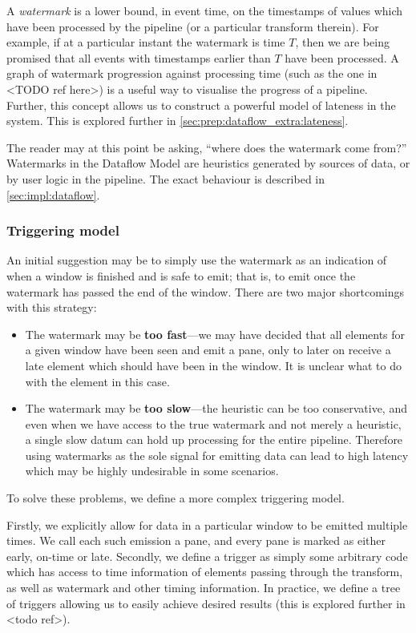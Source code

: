 A \emph{watermark} is a lower bound, in event time, on the timestamps of values which have been processed by the pipeline (or a particular transform therein).
For example, if at a particular instant the watermark is time $T$, then we are being promised that all events with timestamps earlier than $T$ have been processed.
A graph of watermark progression against processing time (such as the one in <TODO ref here>) is a useful way to visualise the progress of a pipeline.
Further, this concept allows us to construct a powerful model of lateness in the system.
This is explored further in \cref{sec:prep:dataflow_extra:lateness}.


The reader may at this point be asking, ``where does the watermark come from?''
Watermarks in the Dataflow Model are heuristics generated by sources of data, or by user logic in the pipeline.
The exact behaviour is described in \cref{sec:impl:dataflow}.

\subsubsection{Triggering model}

An initial suggestion may be to simply use the watermark as an indication of when a window is finished and is safe to emit; that is, to emit once the watermark has passed the end of the window.
There are two major shortcomings with this strategy:
\begin{itemize}
	\item The watermark may be \textbf{too fast}---we may have decided that all elements for a given window have been seen and emit a pane, only to later on receive a late element which should have been in the window.
	It is unclear what to do with the element in this case.
	
	\item The watermark may be \textbf{too slow}---the heuristic can be too conservative, and even when we have access to the true watermark and not merely a heuristic, a single slow datum can hold up processing for the entire pipeline.
	Therefore using watermarks as the sole signal for emitting data can lead to high latency which may be highly undesirable in some scenarios.
\end{itemize} 

To solve these problems, we define a more complex triggering model.

Firstly, we explicitly allow for data in a particular window to be emitted multiple times.
We call each such emission a pane, and every pane is marked as either early, on-time or late.
Secondly, we define a trigger as simply some arbitrary code which has access to time information of elements passing through the transform, as well as watermark and other timing information.
In practice, we define a tree of triggers allowing us to easily achieve desired results (this is explored further in <todo ref>). 

